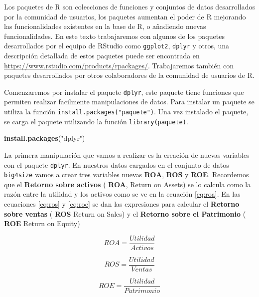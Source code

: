 \documentclass[letterpaper,]{book}
\newenvironment{Shaded}{\begin{snugshade}}{\end{snugshade}}
\newcommand{\KeywordTok}[1]{\textcolor[rgb]{0.13,0.29,0.53}{\textbf{#1}}}
\newcommand{\NormalTok}[1]{#1}
\newcommand{\StringTok}[1]{\textcolor[rgb]{0.31,0.60,0.02}{#1}}
\begin{document}
Los paquetes de R son colecciones de funciones y conjuntos de datos desarrollados por la comunidad de usuarios, los paquetes aumentan el poder de R mejorando las funcionalidades existentes en la base de R, o añadiendo nuevas funcionalidades. En este texto trabajaremos con algunos de los paquetes desarrollados por el equipo de RStudio como \texttt{ggplot2}, \texttt{dplyr} y otros, una descripción detallada de estos paquetes puede ser encontrada en \url{https://www.rstudio.com/products/rpackages/}. Trabajaremos también con paquetes desarrollados por otros colaboradores de la comunidad de usuarios de R.

Comenzaremos por instalar el paquete \texttt{dplyr}, este paquete tiene funciones que permiten realizar facilmente manipulaciones de datos. Para instalar un paquete se utiliza la función \texttt{install.packages("paquete")}. Una vez instalado el paquete, se carga el paquete utilizando la función \texttt{library(paquete)}.

\begin{Shaded}
\begin{Highlighting}[]
\KeywordTok{install.packages}\NormalTok{(}\StringTok{"dplyr"}\NormalTok{)}
\end{Highlighting}
\end{Shaded}

La primera manipulación que vamos a realizar es la creación de nuevas variables con el paquete \texttt{dplyr}. En nuestros datos cargados en el conjunto de datos \texttt{big4size} vamos a crear tres variables nuevas \textbf{ROA}, \textbf{ROS} y \textbf{ROE}. Recordemos que el \textbf{Retorno sobre activos} ( \textbf{ROA}, Return on Assets) se lo calcula como la razón entre la utilidad y los activos como se ve en la ecuación \eqref{eq:roa}. En las ecuaciones \eqref{eq:ros} y \eqref{eq:roe} se dan las expresiones para calcular el \textbf{Retorno sobre ventas} ( \textbf{ROS} Return on Sales) y el \textbf{Retorno sobre el Patrimonio} ( \textbf{ROE} Return on Equity)

\begin{equation} 
  ROA = \dfrac{Utilidad}{Activos}
  \label{eq:roa}
\end{equation}

\begin{equation} 
  ROS = \dfrac{Utilidad}{Ventas}
  \label{eq:ros}
\end{equation}

\begin{equation} 
  ROE = \dfrac{Utilidad}{Patrimonio}
  \label{eq:roe}
\end{equation}
\end{document}
